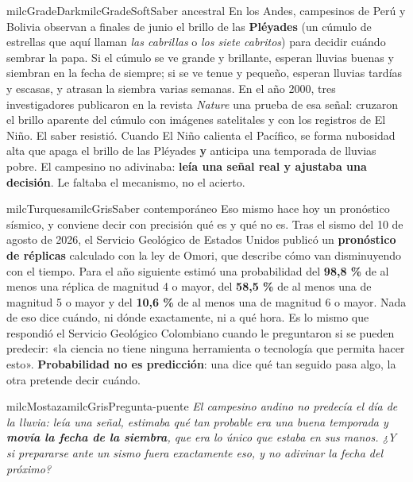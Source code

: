 \documentclass[11pt,letterpaper]{article}
\begin{document}
\begin{softbox}{milcGradeDark}{milcGradeSoft}{Saber ancestral}
En los Andes, campesinos de Perú y Bolivia observan a finales de junio el brillo de las \textbf{Pléyades} (un cúmulo de estrellas que aquí llaman \emph{las cabrillas} o \emph{los siete cabritos}) para decidir cuándo sembrar la papa. Si el cúmulo se ve grande y brillante, esperan lluvias buenas y siembran en la fecha de siempre; si se ve tenue y pequeño, esperan lluvias tardías y escasas, y atrasan la siembra varias semanas. En el año 2000, tres investigadores publicaron en la revista \emph{Nature} una prueba de esa señal: cruzaron el brillo aparente del cúmulo con imágenes satelitales y con los registros de El Niño. El saber resistió. Cuando El Niño calienta el Pacífico, se forma nubosidad alta que apaga el brillo de las Pléyades \textbf{y} anticipa una temporada de lluvias pobre. El campesino no adivinaba: \textbf{leía una señal real y ajustaba una decisión}. Le faltaba el mecanismo, no el acierto.
\end{softbox}

\begin{softbox}{milcTurquesa}{milcGris}{Saber contemporáneo}
Eso mismo hace hoy un pronóstico sísmico, y conviene decir con precisión qué es y qué no es. Tras el sismo del 10 de agosto de 2026, el Servicio Geológico de Estados Unidos publicó un \textbf{pronóstico de réplicas} calculado con la ley de Omori, que describe cómo van disminuyendo con el tiempo. Para el año siguiente estimó una probabilidad del \textbf{98,8 \%} de al menos una réplica de magnitud 4 o mayor, del \textbf{58,5 \%} de al menos una de magnitud 5 o mayor y del \textbf{10,6 \%} de al menos una de magnitud 6 o mayor. Nada de eso dice cuándo, ni dónde exactamente, ni a qué hora. Es lo mismo que respondió el Servicio Geológico Colombiano cuando le preguntaron si se pueden predecir: «la ciencia no tiene ninguna herramienta o tecnología que permita hacer esto». \textbf{Probabilidad no es predicción}: una dice qué tan seguido pasa algo, la otra pretende decir cuándo.
\end{softbox}

\begin{softbox}{milcMostaza}{milcGris}{Pregunta-puente}
\textit{El campesino andino no predecía el día de la lluvia: leía una señal, estimaba qué tan probable era una buena temporada y \textbf{movía la fecha de la siembra}, que era lo único que estaba en sus manos. ¿Y si prepararse ante un sismo fuera exactamente eso, y no adivinar la fecha del próximo?}
\end{softbox}
\end{document}
